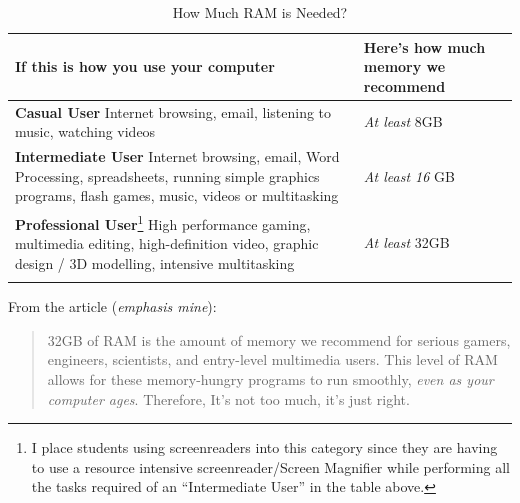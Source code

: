 \documentclass[14pt, letterpaper,twoside]{extreport}
\begin{document}
\begin{longtable}[]{@{}
    >{\raggedright\arraybackslash}p{}
    >{\raggedright\arraybackslash}p{}@{}
    }
    \toprule\noalign{}
    
    \textbf{If this is how you use your computer}                                                                                                                                                                                                                                                                                                                                                         & \textbf{Here's how much memory we recommend} \\
    \midrule\noalign{}
    \endhead
    \bottomrule\noalign{}
    \endlastfoot
    \textbf{Casual User} \break Internet browsing, email, listening to music, watching videos                                                                                                                                                                                                                                                                                                             & \emph{At least} 8GB                          \\[1.0em] 
    \textbf{Intermediate User} \break Internet browsing, email, Word Processing, spreadsheets, running simple graphics programs, flash games, music, videos or multitasking                                                                                                                                                                                                                               & \emph{At least 16} GB                        \\[1.0em] 
    \textbf{Professional User}\footnote{I place students using screenreaders into this category since they are having to use a resource intensive screenreader/Screen Magnifier while performing all the tasks required of an ``Intermediate User'' in the table above.} \break High performance gaming, multimedia editing, high-definition video, graphic design / 3D modelling, intensive multitasking & \emph{At least} 32GB                         \\[1.0em] \hline
    \caption{How Much RAM is Needed?}
\end{longtable}


From the article (\emph{emphasis mine}):
\begin{quote}
    32GB of RAM is the amount of memory we recommend for serious gamers, engineers, scientists, and entry-level multimedia users. This level of RAM allows for these memory-hungry programs to run smoothly, \emph{even as your computer ages}. Therefore, It's not too much, it's just right.
\end{quote}
\end{document}
